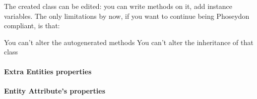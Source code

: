 \documentclass[a4paper,10pt,twoside]{book}
\begin{document}
The created class can be edited: you can write methods on it, add instance variables. The only limitations by now, if you want to continue being Phoseydon compliant, is that:

You can't alter the autogenerated methods
You can't alter the inheritance of that class

\paragraph{Extra Entities properties}

\paragraph{Entity Attribute's properties}



\ifx\wholebook\relax\else
   
   
\end{document}
